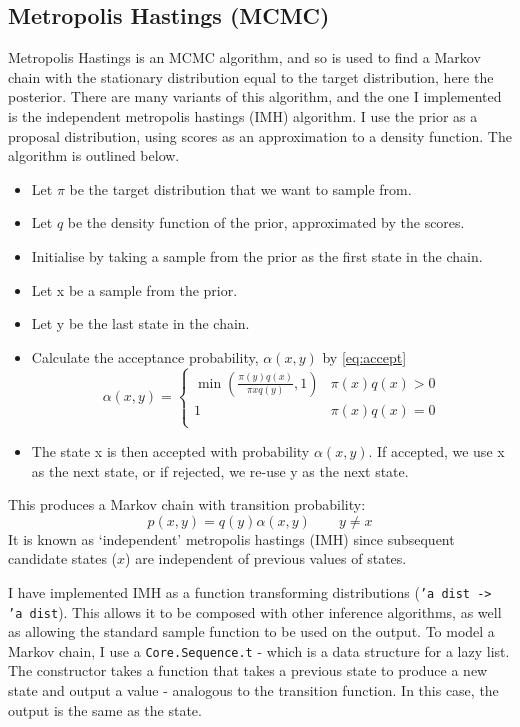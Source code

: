 \subsection{Metropolis Hastings (MCMC)} \label{sec:mh}
Metropolis Hastings is an MCMC algorithm, and so is used to find a Markov chain with the stationary distribution equal to the target distribution, here the posterior. There are many variants of this algorithm, and the one I implemented is the independent metropolis hastings (IMH) algorithm. I use the prior as a proposal distribution, using scores as an approximation to a density function. The algorithm is outlined below.
\begin{itemize}[itemsep=-0.8ex]
	\item Let $\pi$ be the target distribution that we want to sample from.
	\item Let $q$ be the density function of the prior, approximated by the scores.
	\item Initialise by taking a sample from the prior as the first state in the chain.
	\item Let x be a sample from the prior.
	\item Let y be the last state in the chain.
	\item Calculate the acceptance probability, $\alpha(x,y)$ by \eqref{eq:accept}
	      \begin{equation}
	      	\label{eq:accept}
	      	\alpha(x,y) = 
	      	\begin{cases}
	      		\min{\left( \frac{\pi(y)q(x)}{\pi{x}q(y)},1 \right) } & \pi(x)q(x) > 0 \\
	      		1                                                     & \pi(x)q(x) = 0 \\
	      	\end{cases}
	      \end{equation}	      	      	      	      
	\item The state x is then accepted with probability $\alpha(x,y)$. If accepted, we use x as the next state, or if rejected, we re-use y as the next state. 
\end{itemize}
				
This produces a Markov chain with transition probability: \[p(x, y) = q(y)\alpha(x, y) \quad\quad y\neq x\]
It is known as `independent' metropolis hastings (IMH) since subsequent candidate states ($x$) are independent of previous values of states.
				
I have implemented IMH as a function transforming distributions (\texttt{'a dist -> 'a dist}). This allows it to be composed with other inference algorithms, as well as allowing the standard sample function to be used on the output. To model a Markov chain, I use a \texttt{Core.Sequence.t} - which is a data structure for a lazy list. The constructor takes a function that takes a previous state to produce a new state and output a value - analogous to the transition function. In this case, the output is the same as the state.
				
